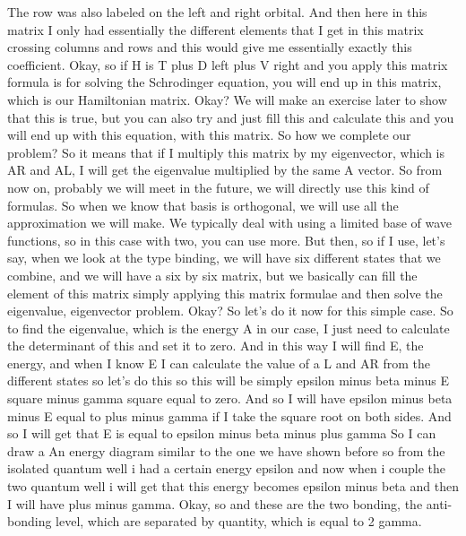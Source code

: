 The row was also labeled on the left and right orbital. And then here in this matrix I only had essentially the different elements that I get in this matrix crossing columns and rows and this would give me essentially exactly this coefficient. Okay, so if H is T plus D left plus V right and you apply this matrix formula is for solving the Schrodinger equation, you will end up in this matrix, which is our Hamiltonian matrix. Okay? We will make an exercise later to show that this is true, but you can also try and just fill this and calculate this and you will end up with this equation, with this matrix. So how we complete our problem? So it means that if I multiply this matrix by my eigenvector, which is AR and AL, I will get the eigenvalue multiplied by the same A vector. So from now on, probably we will meet in the future, we will directly use this kind of formulas. So when we know that basis is orthogonal, we will use all the approximation we will make. We typically deal with using a limited base of wave functions, so in this case with two, you can use more. But then, so if I use, let's say, when we look at the type binding, we will have six different states that we combine, and we will have a six by six matrix, but we basically can fill the element of this matrix simply applying this matrix formulae and then solve the eigenvalue, eigenvector problem. Okay? So let's do it now for this simple case.
So to find the eigenvalue, which is the energy A in our case, I just need to calculate the determinant of this and set it to zero. And in this way I will find E, the energy, and when I know E I can calculate the value of a L and AR from the different states so let's do this so this will be simply epsilon minus beta minus E square minus gamma square equal to zero. And so I will have epsilon minus beta minus E equal to plus minus gamma if I take the square root on both sides. And so I will get that E is equal to epsilon minus beta minus plus gamma So I can draw a An energy diagram similar to the one we have shown before so from the isolated quantum well i had a certain energy epsilon and now when i couple the two quantum well i will get that this energy becomes epsilon minus beta and then I will have plus minus gamma. Okay, so and these are the two bonding, the anti-bonding level, which are separated by quantity, which is equal to 2 gamma.\\
